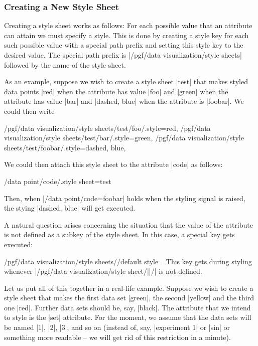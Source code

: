 \subsubsection{Creating a New Style Sheet}

Creating a style sheet works as follows: For each
possible value that an attribute can attain we must specify a
style. This is done by creating a style key for each such possible
value with a special path prefix and setting this style key to the
desired value. The special path prefix is
|/pgf/data visualization/style sheets| followed by the name of the
style sheet.

As an example, suppose we wish to create a style sheet |test| that makes
styled data points |red| when the attribute has value |foo| and
|green| when the attribute has value |bar| and |dashed, blue| when the
attribute is |foobar|. We could then write
\begin{codeexample}
/pgf/data visualization/style sheets/test/foo/.style={red},    
/pgf/data visualization/style sheets/test/bar/.style={green},    
/pgf/data visualization/style sheets/test/foobar/.style={dashed, blue},    
\end{codeexample}

We could then attach this style sheet to the attribute |code| as
follows:
\begin{codeexample}
/data point/code/.style sheet=test
\end{codeexample}

Then, when |/data point/code=foobar| holds when the styling signal is
raised, the stying |dashed, blue| will get executed.

A natural question arises concerning the situation that the value of
the attribute is not defined as a subkey of the style sheet. In this
case, a special key gets executed:

\begin{stylekey}{/pgf/data visualization/style sheets//default style=}
  This key gets during styling whenever
  |/pgf/data visualization/style sheet/||/| is not defined. 
\end{stylekey}

Let us put all of this together in a real-life example. Suppose we
wish to create a style sheet that makes the first data set |green|, the
second |yellow| and the third one |red|. Further data sets should be,
say, |black|. The attribute that we intend to style is the |set|
attribute. For the moment, we assume that the data sets will be named
|1|, |2|, |3|, and so on (instead of, say, |experiment 1| or |sin| or
something more readable -- we will get rid of this restriction in a
minute).

